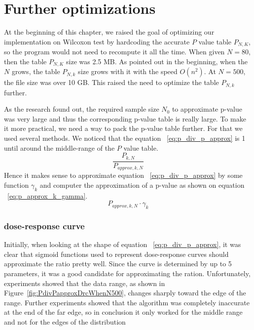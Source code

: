 \documentclass[12pt]{article}
\begin{document}
{\section{Further optimizations}
At the beginning of this chapter, we raised the goal of optimizing our implementation on Wilcoxon test by hardcoding the accurate $P$ value table $P_{N, K}$, so the program would not need to recompute it all the time. When given $N = 80$, then the table $P_{N, K}$ size was 2.5 MB. As pointed out in the beginning, when the $N$ grows, the table $P_{N, k}$ size grows with it with the speed $O(n^2)$. At $N = 500$, the file size was over 10 GB. This raised the need to optimize the table $P_{N, k}$ further.

As the research found out, the required sample size $N_0$ to approximate p-value was very large and thus the corresponding p-value table is really large. To make it more practical, we need a way to pack the p-value table further. For that we used several methods. We noticed that the equation ~\eqref{eq:p_div_p_approx} is 1 until around the middle-range of the $P$ value table.
\begin{equation}\label{eq:p_div_p_approx}
  \frac{P_{k, N}}{P_{approx, k, N}}
\end{equation}
Hence it makes sense to approximate equation ~\eqref{eq:p_div_p_approx} by some function $\gamma_k$ and computer the approximation of a p-value as shown on equation ~\eqref{eq:p_approx_k_gamma}.
\begin{equation}\label{eq:p_approx_k_gamma}
  P_{approx, k, N} \cdot \gamma_k
\end{equation}


\subsubsection{dose-response curve}
Initially, when looking at the shape of equation ~\eqref{eq:p_div_p_approx}, it was clear that sigmoid functions used to represent dose-response curves should approximate the ratio pretty well. Since the curve is determined by up to 5 parameters, it was a good candidate for approximating the ration. Unfortunately, experiments showed that the data range, as shown in Figure~\ref{fig:PdivPapproxDrcWhenN500}, changes sharply toward the edge of the range. Further experiments showed that the algorithm was completely inaccurate at the end of the far edge, so in conclusion it only worked for the middle range and not for the edges of the distribution

}
\end{document}
